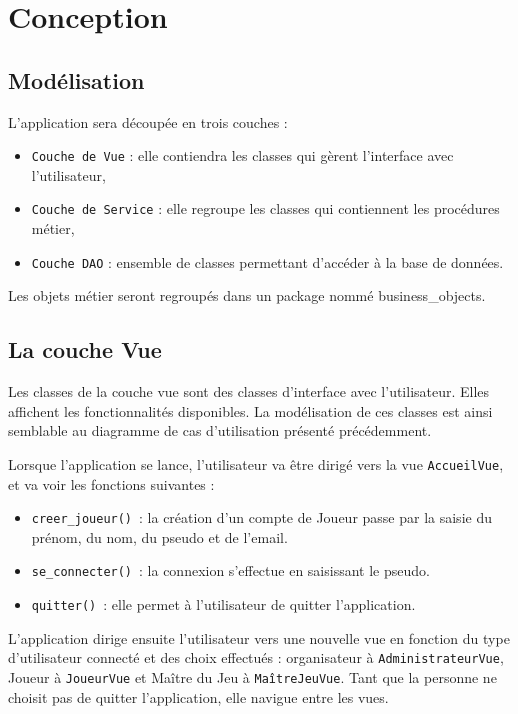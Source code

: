 \documentclass[11pt]{article}
\begin{document}
\newpage
\section{Conception}

\subsection{Modélisation}

L'application sera découpée en trois couches :
\begin{itemize}
    \item \texttt{Couche de Vue} : elle contiendra les classes qui gèrent l'interface avec l'utilisateur,
    \item \texttt{Couche de Service} : elle regroupe les classes qui contiennent les procédures métier,
    \item \texttt{Couche DAO} : ensemble de classes permettant d'accéder à la base de données.
\end{itemize}

\bigbreak

Les objets métier seront regroupés dans un package nommé business\_objects.

\subsection{La couche Vue}

Les classes de la couche vue sont des classes d'interface avec l'utilisateur. Elles affichent les fonctionnalités disponibles. La modélisation de ces classes est ainsi semblable au diagramme de cas d'utilisation présenté précédemment.

\bigbreak

Lorsque l'application se lance, l'utilisateur va être dirigé vers la vue \texttt{AccueilVue}, et va voir les fonctions suivantes :
\begin{itemize}[label=, font=\small]
    \item \texttt{creer\_joueur()}~: la création d'un compte de Joueur passe par la saisie du prénom, du nom, du pseudo et de l'email.
    \item \texttt{se\_connecter()}~: la connexion s'effectue en saisissant le pseudo.
    \item \texttt{quitter()}~: elle permet à l'utilisateur de quitter l'application. 
\end{itemize}
L'application dirige ensuite l'utilisateur vers une nouvelle vue en fonction du type d'utilisateur connecté et des choix effectués : organisateur à \texttt{AdministrateurVue}, Joueur à \texttt{JoueurVue} et Maître du Jeu à \texttt{MaîtreJeuVue}. Tant que la personne ne choisit pas de quitter l'application, elle navigue entre les vues.
\bigbreak
\end{document}
